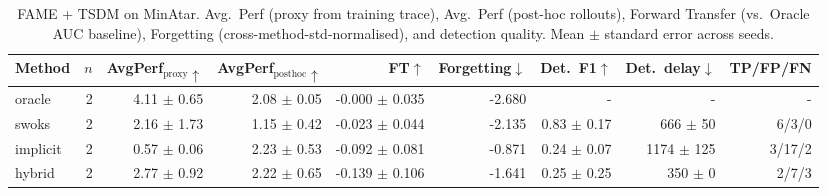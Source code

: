 \begin{table}[t]
\centering
\caption{FAME + TSDM on MinAtar. Avg.~Perf (proxy from training trace), Avg.~Perf (post-hoc rollouts), Forward Transfer (vs.~Oracle AUC baseline), Forgetting (cross-method-std-normalised), and detection quality. Mean $\pm$ standard error across seeds.}
\label{tab:fame-tsdm}
\begin{tabular}{lrrrrrrrr}
\toprule
Method & $n$ & AvgPerf$_{\text{proxy}}\uparrow$ & AvgPerf$_{\text{posthoc}}\uparrow$ & FT$\uparrow$ & Forgetting$\downarrow$ & Det.\ F1$\uparrow$ & Det.\ delay$\downarrow$ & TP/FP/FN \\
\midrule
oracle & 2 & 4.11 $\pm$ 0.65 & 2.08 $\pm$ 0.05 & -0.000 $\pm$ 0.035 & -2.680 & - & - & - \\
swoks & 2 & 2.16 $\pm$ 1.73 & 1.15 $\pm$ 0.42 & -0.023 $\pm$ 0.044 & -2.135 & 0.83 $\pm$ 0.17 & 666 $\pm$ 50 & 6/3/0 \\
implicit & 2 & 0.57 $\pm$ 0.06 & 2.23 $\pm$ 0.53 & -0.092 $\pm$ 0.081 & -0.871 & 0.24 $\pm$ 0.07 & 1174 $\pm$ 125 & 3/17/2 \\
hybrid & 2 & 2.77 $\pm$ 0.92 & 2.22 $\pm$ 0.65 & -0.139 $\pm$ 0.106 & -1.641 & 0.25 $\pm$ 0.25 & 350 $\pm$ 0 & 2/7/3 \\
\bottomrule
\end{tabular}
\end{table}
